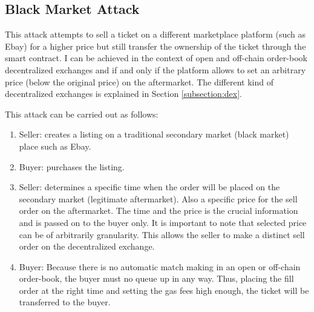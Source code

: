 
\subsection{Black Market Attack}\label{subsection:black-market-attack}
This attack attempts to sell a ticket on a different marketplace platform (such as Ebay) for a higher price but still transfer the ownership of the ticket through the smart contract. I can be achieved in the context of open and off-chain order-book decentralized exchanges and if and only if the platform allows to set an arbitrary price (below the original price) on the aftermarket. The different kind of decentralized exchanges is explained in Section \ref{subsection:dex}.

This attack can be carried out as follows:

\begin{enumerate}
    \item Seller: creates a listing on a traditional secondary market (black market) place such as Ebay.
    \item Buyer: purchases the listing.
    \item Seller: determines a specific time when the order will be placed on the secondary market (legitimate aftermarket). Also a specific price for the sell order on the aftermarket. The time and the price is the crucial information and is passed on to the buyer only. It is important to note that selected price can be of arbitrarily granularity. This allows the seller to make a distinct sell order on the decentralized exchange. 
    \item Buyer: Because there is no automatic match making in an open or off-chain order-book, the buyer must no queue up in any way. Thus, placing the fill order at the right time and setting the gas fees high enough, the ticket will be transferred to the buyer. 
\end{enumerate}

